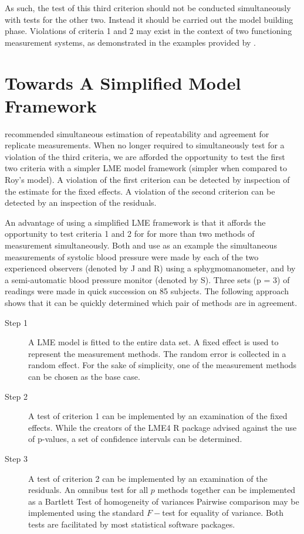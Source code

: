 \documentclass[12pt, a4paper]{report}
\theoremstyle{plain}
\theoremstyle{definition}
\theoremstyle{remark}
\begin{document}
As such, the test of this third criterion should not be conducted simultaneously with tests for the other two. Instead it should be carried out the model building phase. Violations of criteria 1 and 2 may exist in the context of two functioning measurement systems, as demonstrated in the examples provided by \citet{ARoy2009}.


\section{Towards A Simplified Model Framework}
\citet{BA99} recommended simultaneous estimation of repeatability and agreement
for replicate measurements. When no longer required to simultaneously test for a violation of the third criteria, we are afforded the opportunity to test the first two criteria with a simpler LME model framework (simpler when compared to Roy's model). A violation of the first criterion can be detected by inspection of the estimate for the fixed effects. A violation of the second criterion can be detected by an inspection of the residuals.


 
An advantage of using a simplified LME framework is that it affords the opportunity to test criteria 1 and 2 for for more than two methods of measurement simultaneously. Both \citet{BA99} and \citet{ARoy2009} use as an example the simultaneous measurements of systolic blood pressure
were made by each of the two experienced observers (denoted by J and R) using
a sphygmomanometer, and by a semi-automatic blood pressure monitor (denoted
by S). Three sets (p = 3) of readings were made in quick succession on 85 subjects. The following approach shows that it can be quickly determined which pair of methods are in agreement.

\begin{description}
	\item[Step 1] A LME model is fitted to the entire data set. A fixed effect is used to represent the measurement methods. The random error is collected in a random effect. For the sake of simplicity, one of the measurement methods can be chosen as the base case.
	
	\item[Step 2] A test of criterion 1 can be implemented by an examination of the fixed effects. While the creators of the LME4 R package advised against the use of p-values, a set of confidence intervals can be determined.
	
	\item[Step 3] A test of criterion 2 can be implemented by an examination of the residuals. An omnibus test for all $p$ methods together can be implemented as a Bartlett Test of homogeneity of variances Pairwise comparison may be implemented using the standard $F-$test for equality of variance. Both tests are facilitated by most statistical software packages.
\end{description}
\end{document}
